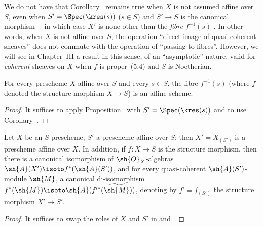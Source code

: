 \begin{remark}[1.5.3]
\label{2.1.5.3}
We do not have that Corollary~ remains true when $X$ is not assumed affine over $S$, even when $S'=\Spec(\kres(s))$ ($s\in S$) and $S'\to S$ is the canonical morphism ---in which case $X'$ is none other than the \emph{fibre $f^{-1}(s)$} .
In other words, when $X$ is not affine over $S$, the operation
``direct image of quasi-coherent sheaves'' does not commute with the operation of ``passing to fibres''.
However, we will see in Chapter~III  a result in this sense, of an ``asymptotic'' nature, valid for \emph{coherent} sheaves on $X$ when $f$ is proper~(5.4) and $S$ is Noetherian.
\end{remark}

\begin{corollary}[1.5.4]
\label{2.1.5.4}
For every prescheme $X$ affine over $S$ and every $s\in S$, the fibre $f^{-1}(s)$ (where $f$ denoted the structure morphism $X\to S$) is an affine scheme.
\end{corollary}

\begin{proof}
\label{proof-2.1.5.4}
It suffices to apply Proposition~ with $S'=\Spec(\kres(s))$ and to use Corollary~.
\end{proof}

\begin{corollary}[1.5.5]
\label{2.1.5.5}
Let $X$ be an $S$-prescheme, $S'$ a prescheme affine over $S$; then $X'=X_{(S')}$ is a prescheme affine over $X$.
In addition, if $f:X\to S$ is the structure morphism, then there is a canonical isomorphism of $\sh{O}_X$-algebras $\sh{A}(X')\isoto f^*(\sh{A}(S'))$, and for every quasi-coherent $\sh{A}(S')$-module $\sh{M}$, a canonical di-isomorphism $f^*(\sh{M})\isoto\sh{A}(f^{\prime*}(\widetilde{\sh{M}}))$, denoting by $f'=f_{(S')}$ the structure morphism $X'\to S'$.
\end{corollary}

\begin{proof}
\label{proof-2.1.5.5}
It suffices to swap the roles of $X$ and $S'$ in  and .
\end{proof}

